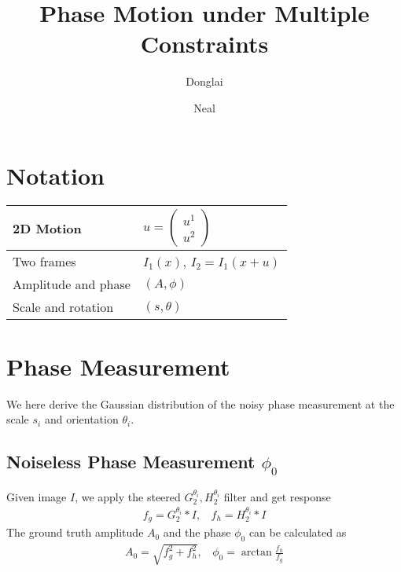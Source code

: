 \documentclass{article}
\begin{document}
\title{Phase Motion under Multiple Constraints}
\author{
Donglai \and Neal \\
}

\maketitle


\section{Notation}
\begin{tabular}{|l|l|}
\hline
2D Motion&$u=\left(\begin{array}{c}u^1\\u^2\end{array}\right)$\\
\hline 
Two frames& $I_1(x)$, $I_2=I_1(x+u)$\\
\hline 
Amplitude and phase& $(A,\phi)$\\
\hline 
Scale and rotation& $(s,\theta)$\\
\hline 
\end{tabular}
\section{Phase Measurement}
We here derive the Gaussian distribution of the noisy phase measurement at the scale $s_i$ and orientation $\theta_i$.
\subsection{Noiseless Phase Measurement $\phi_0$}
Given image $I$, we apply the steered $G_2^{\theta_i},H_2^{\theta_i}$ filter and get response
\begin{align}
f_g = G_2^{\theta_i} \ast I,\ \ \ \  
f_h = H_2^{\theta_i} \ast I
\end{align}
The ground truth amplitude $A_0$ and the phase $\phi_0$ can be calculated as
\begin{align}
A_0 = \sqrt{f_g^2+f_h^2},\ \ \ \  
\phi_0 = \arctan{\frac{f_h}{f_g}}
\end{align}
\end{document}

